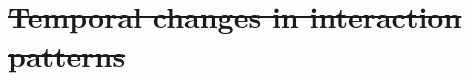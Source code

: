 \documentclass[12pt]{article}
\providecommand{\DIFdeltex}[1]{{\protect\color{red}\sout{#1}}}                      %
\providecommand{\DIFaddbegin}{} %
\providecommand{\DIFdelbegin}{} %
\providecommand{\DIFdelend}{} %
\providecommand{\DIFdel}[1]{\texorpdfstring{\DIFdeltex{#1}}{}} %
\begin{document}
\DIFdelbegin \section*{\DIFdel{Temporal changes in interaction patterns}}
\DIFdelend %
\DIFaddbegin 

\end{document}
